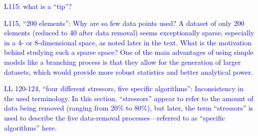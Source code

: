 \documentclass[
]{article}
\begin{document}
\textcolor{blue}{L115: what is a ``tip''?}

\textcolor{blue}{L115, ``200 elements'': Why are so few data points used? A dataset of only 200 elements (reduced to 40 after data removal) seems exceptionally sparse, especially in a 4- or 8-dimensional space, as noted later in the text.
What is the motivation behind studying such a sparse space? One of the main advantages of using simple models like a branching process is that they allow for the generation of larger datasets, which would provide more robust statistics and better analytical power.}


\textcolor{blue}{LL 120-124, ``four different stressors, five specific algorithms'': Inconsistency in the used terminology.
In this section, ``stressors'' appear to refer to the amount of data being removed (ranging from 20\% to 80\%), but later, the term ``stressors'' is used to describe the five data-removal processes---referred to as ``specific algorithms'' here.}
\end{document}
